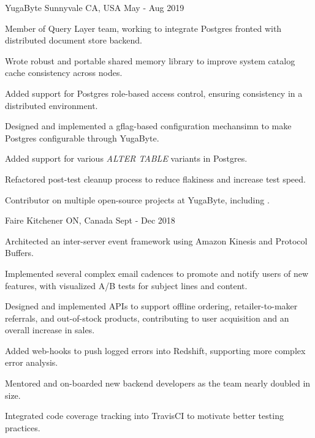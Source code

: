 
\begin{cventries}

   {YugaByte} {Sunnyvale CA, USA} {May - Aug
    2019} {
    \begin{cvitems}
    \item Member of Query Layer team, working to integrate Postgres fronted with
      distributed document store backend.
    \item Wrote robust and portable shared memory library to improve system
      catalog cache consistency across nodes.
    \item Added support for Postgres role-based access control, ensuring
      consistency in a distributed environment.
    \item Designed and implemented a gflag-based configuration mechansimn to
      make Postgres configurable through YugaByte.
    \item Added support for various \textit{ALTER TABLE} variants in Postgres.
    \item Refactored post-test cleanup process to reduce flakiness and increase
      test speed.
    \item Contributor on multiple open-source projects at YugaByte, including
      \thinspace
      \href{https://github.com/YugaByte/yugabyte-db/commits?author=srhickma}{\color[HTML]{3090C7}{yugabyte-db
          \faExternalLink}}.
    \end{cvitems}
  }

   {Faire} {Kitchener ON, Canada} {Sept - Dec
    2018} {
    \begin{cvitems}
    \item Architected an inter-server event framework using Amazon Kinesis and
      Protocol Buffers.
    \item Implemented several complex email cadences to promote and notify users
      of new features, with visualized A/B tests for subject lines and content.
    \item Designed and implemented APIs to support offline ordering,
      retailer-to-maker referrals, and out-of-stock products, contributing to
      user acquisition and an overall increase in sales.
    \item Added web-hooks to push logged errors into Redshift, supporting more
      complex error analysis.
    \item Mentored and on-boarded new backend developers as the team nearly
      doubled in size.
    \item Integrated code coverage tracking into TravisCI to motivate better
      testing practices.
    \end{cvitems}
  }
    

\end{cventries}
